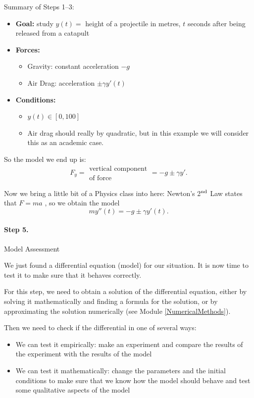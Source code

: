 \begin{example}

Summary of Steps 1--3:
\begin{itemize}
	\item \textbf{Goal:} study $y(t) = $ height of a projectile in metres, $t$ seconds after being released from a catapult
	\item \textbf{Forces:}
	\begin{itemize}
		\item Gravity: constant acceleration $-g$
		\item Air Drag: acceleration $\pm \gamma y'(t)$
	\end{itemize}
	\item \textbf{Conditions:}
	\begin{itemize}
		\item $y(t) \in [0,100]$
		\item Air drag should really by quadratic, but in this example we will consider this as an academic case.
	\end{itemize}
\end{itemize}

So the model we end up is:
$$
F_y = \substack{\text{vertical component}\\\text{of force}} = -g \pm \gamma y'.
$$

Now we bring a little bit of a Physics class into here: Newton's 2$^{\rm nd}$ Law states that \quad $F = m a$ \quad, so we obtain the model
$$m y''(t) =  -g \pm \gamma y'(t).$$
\end{example}



\paragraph{Step 5.} Model Assessment

We just found a differential equation (model) for our situation. It is now time to test it to make sure that it behaves correctly.

For this step, we need to obtain a solution of the differential equation, either by solving it mathematically and finding a formula for the solution, or by approximating the solution numerically (see Module \ref{NumericalMethods}).

Then we need to check if the differential in one of several ways:
\begin{itemize}
	\item We can test it empirically: make an experiment and compare the results of the experiment with the results of the model
	\item We can test it mathematically: change the parameters and the initial conditions to make sure that we know how the model should behave and test some qualitative aspects of the model
\end{itemize}

